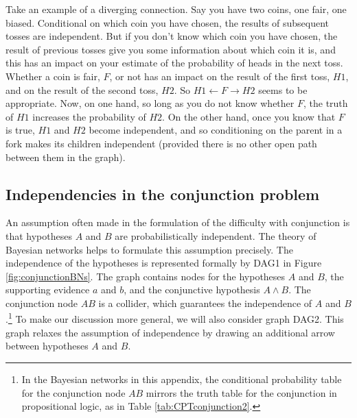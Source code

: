 \documentclass[
  10pt,
  dvipsnames,enabledeprecatedfontcommands]{scrartcl}
\begin{document}
{Take an example of a diverging connection.  Say you have two coins, one fair, one biased. Conditional on which coin you have chosen, the results of subsequent tosses are independent. But if you don't know which coin you have chosen, the result of previous tosses give you some information about which coin it is, and this has an impact on your estimate of the probability of heads in the next toss. Whether a coin is fair, $F$, or not has an impact on the result of the first toss, $H1$, and on the result of the second toss, $H2$.  So $H1 \leftarrow F \rightarrow H2$ seems to be appropriate. Now, on one hand, so long as you do not know whether $F$, the truth of $H1$ increases the probability of $H2$.  On the other hand, once you know that $F$ is true, $H1$ and $H2$ become independent, and so conditioning on the parent in a fork makes its children independent (provided there is no other open path between them in the graph).}

\hypertarget{independencies-in-the-conjunction-problem}{%
\subsection*{Independencies in the conjunction
problem}\label{independencies-in-the-conjunction-problem}}

An assumption often made in the formulation of the difficulty with
conjunction is that hypotheses \(A\) and \(B\) are probabilistically
independent. The theory of Bayesian networks helps to formulate this
assumption precisely. The independence of the hypotheses is represented
formally by \textsf{DAG1} in Figure \ref{fig:conjunctionBNs}. The graph
contains nodes for the hypotheses \(A\) and \(B\), the supporting
evidence \(a\) and \(b\), and the conjunctive hypothesis \(A\wedge B\).
The conjunction node \(AB\) is a collider, which guarantees the
independence of \(A\) and \(B\).\footnote{In the Bayesian networks in
  this appendix, the conditional probability table for the conjunction
  node \(AB\) mirrors the truth table for the conjunction in
  propositional logic, as in Table \ref{tab:CPTconjunction2}.} To make
our discussion more general, we will also consider graph \textsf{DAG2}.
This graph relaxes the assumption of independence by drawing an
additional arrow between hypotheses \(A\) and \(B\).

\vspace{1mm}
\footnotesize

\normalsize
\end{document}
